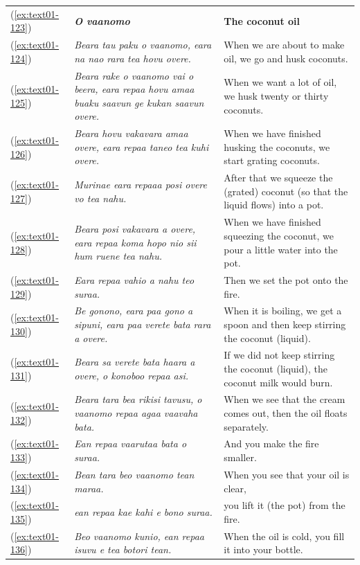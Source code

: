 \documentclass[output=paper]{langscibook}
\begin{document}
\begin{xltabular}{\textwidth}{lXX}
    (\ref{ex:text01-123})&\textit{\textbf{O vaanomo}}&\textbf{The coconut oil}\\
    (\ref{ex:text01-124})&\textit{Beara tau paku o vaanomo, eara na nao rara tea hovu overe.}&When we are about to make oil, we go and husk coconuts.\\
    (\ref{ex:text01-125})&\textit{Beara rake o vaanomo vai o beera, eara repaa hovu amaa buaku saavun ge kukan saavun overe.}&When we want a lot of oil, we husk twenty or thirty coconuts.\\
    (\ref{ex:text01-126})&\textit{Beara hovu vakavara amaa overe, eara repaa taneo tea kuhi overe.}&When we have finished husking the coconuts, we start grating coconuts.\\
    (\ref{ex:text01-127})&\textit{Murinae eara repaaa posi overe vo tea nahu.}&After that we squeeze the (grated) coconut (so that the liquid flows) into a pot.\\
    (\ref{ex:text01-128})&\textit{Beara posi vakavara a overe, eara repaa koma hopo nio sii hum ruene tea nahu.}&When we have finished squeezing the coconut, we pour a little water into the pot.\\
    (\ref{ex:text01-129})&\textit{Eara repaa vahio a nahu teo suraa.}&Then we set the pot onto the fire.\\
    (\ref{ex:text01-130})&\textit{Be gonono, eara paa gono a sipuni, eara paa verete bata rara a overe.}&When it is boiling, we get a spoon and then keep stirring the coconut (liquid).\\
    (\ref{ex:text01-131})&\textit{Beara sa verete bata haara a overe, o konoboo repaa asi.}&If we did not keep stirring the coconut (liquid), the coconut milk would burn.\\
    (\ref{ex:text01-132})&\textit{Beara tara bea rikisi tavusu, o vaanomo repaa agaa vaavaha bata.}&When we see that the cream comes out, then the oil floats separately.\\
    (\ref{ex:text01-133})&\textit{Ean repaa vaarutaa bata o suraa.}&And you make the fire smaller.\\
    (\ref{ex:text01-134})&\textit{Bean tara beo vaanomo tean maraa.}&When you see that your oil is clear,\\
    (\ref{ex:text01-135})&\textit{ean repaa kae kahi e bono suraa.}&you lift it (the pot) from the fire.\\
    (\ref{ex:text01-136})&\textit{Beo vaanomo kunio, ean repaa isuvu e tea botori tean.}&When the oil is cold, you fill it into your bottle.\\

\end{xltabular}
\end{document}

